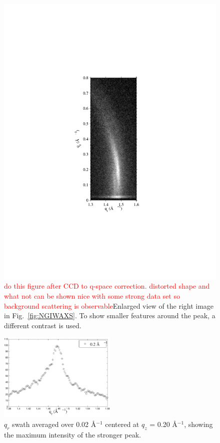 \begin{figure}[htbp]
  \centering
  \includegraphics[trim=100 170 100 170,clip,width=\textwidth]{figures/ripple/NGIWAXS/dmpc1_enlarge}
  \caption{\textcolor{red}{do this figure after CCD to q-space correction.
  distorted shape and what not can be shown nice with some strong data set
  so background scattering is observable}Enlarged view of the right image in Fig.~\ref{fig:NGIWAXS}. To show 
  smaller features around the peak, a different contrast is used.}
  \label{fig:NGIWAXS_enlarge}
\end{figure}

\begin{figure}[htbp]
  \centering
  \includegraphics[width=0.5\textwidth]{figures/ripple/NGIWAXS/qrplot8}
  \caption[$q_r$ swath averaged over 0.02 \AA$^{-1}$ centered at 
  $q_z$ = 0.20 \AA$^{-1}$]{$q_r$ swath averaged over 0.02 \AA$^{-1}$ centered at 
  $q_z$ = 0.20 \AA$^{-1}$, showing the maximum intensity of the stronger
  peak.}
  \label{fig:strong_peak}
\end{figure}

